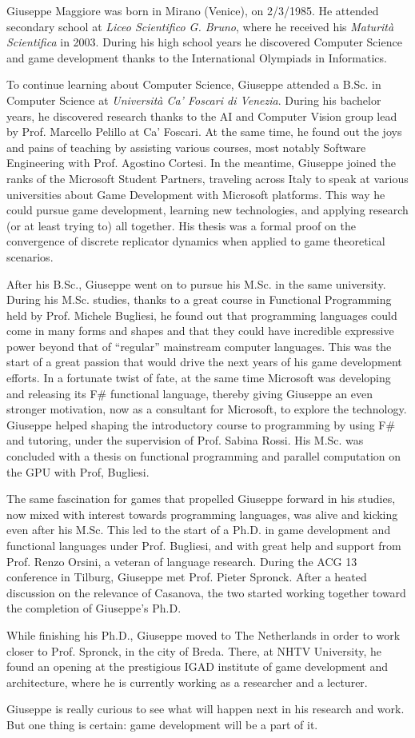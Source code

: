 Giuseppe Maggiore was born in Mirano (Venice), on 2/3/1985. He attended secondary school at \textit{Liceo Scientifico G. Bruno}, where he received his \textit{Maturità Scientifica} in 2003. During his high school years he discovered Computer Science and game development thanks to the International Olympiads in Informatics. 

To continue learning about Computer Science, Giuseppe attended a B.Sc. in Computer Science at \textit{Università Ca' Foscari di Venezia}. During his bachelor years, he discovered research thanks to the AI and Computer Vision group lead by Prof. Marcello Pelillo at Ca' Foscari. At the same time, he found out the joys and pains of teaching by assisting various courses, most notably Software Engineering with Prof. Agostino Cortesi. In the meantime, Giuseppe joined the ranks of the Microsoft Student Partners, traveling across Italy to speak at various universities about Game Development with Microsoft platforms. This way he could pursue game development, learning new technologies, and applying research (or at least trying to) all together. His thesis was a formal proof on the convergence of discrete replicator dynamics when applied to game theoretical scenarios.

After his B.Sc., Giuseppe went on to pursue his M.Sc. in the same university. During his M.Sc. studies, thanks to a great course in Functional Programming held by Prof. Michele Bugliesi, he found out that programming languages could come in many forms and shapes and that they could have incredible expressive power beyond that of ``regular'' mainstream computer languages. This was the start of a great passion that would drive the next years of his game development efforts. In a fortunate twist of fate, at the same time Microsoft was developing and releasing its F\# functional language, thereby giving Giuseppe an even stronger motivation, now as a consultant for Microsoft, to explore the technology. Giuseppe helped shaping the introductory course to programming by using F\# and tutoring, under the supervision of Prof. Sabina Rossi. His M.Sc. was concluded with a thesis on functional programming and parallel computation on the GPU with Prof, Bugliesi.

The same fascination for games that propelled Giuseppe forward in his studies, now mixed with interest towards programming languages, was alive and kicking even after his M.Sc. This led to the start of a Ph.D. in game development and functional languages under Prof. Bugliesi, and with great help and support from Prof. Renzo Orsini, a veteran of language research. During the ACG 13 conference in Tilburg, Giuseppe met Prof. Pieter Spronck. After a heated discussion on the relevance of Casanova, the two started working together toward the completion of Giuseppe's Ph.D.

While finishing his Ph.D., Giuseppe moved to The Netherlands in order to work closer to Prof. Spronck, in the city of Breda. There, at NHTV University, he found an opening at the prestigious IGAD institute of game development and architecture, where he is currently working as a researcher and a lecturer.

Giuseppe is really curious to see what will happen next in his research and work. But one thing is certain: game development will be a part of it.
